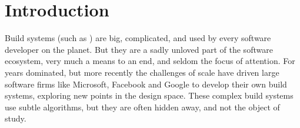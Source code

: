 \section{Introduction}\label{sec-intro}


Build systems (such as \Make) are big, complicated, and used by every
software developer on the planet.  But they are a sadly unloved part
of the software ecosystem, very much a means to an end, and seldom the
focus of attention.
For years \Make dominated, but more recently the challenges of scale have driven
large software firms like Microsoft, Facebook and Google to develop their own
build systems, exploring new points in the design space. These complex build
systems use subtle algorithms, but they are often hidden away, and not the
object of study.

